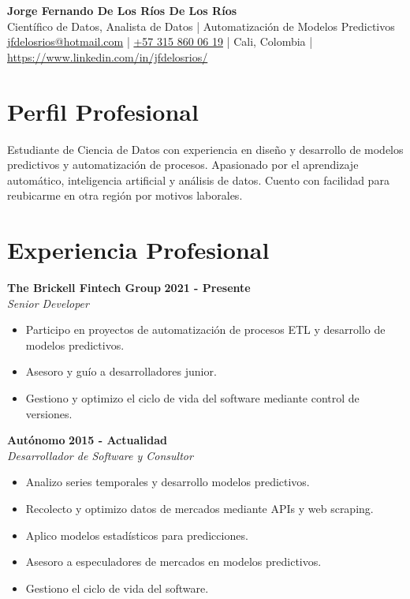 \documentclass[letterpaper,12pt]{article}
\begin{document}
\singlespacing 

\justifying 

\begin{center}
    {\LARGE \textbf{Jorge Fernando De Los R\'ios De Los R\'ios}}\\
    \vspace{0.2cm}
    Cient\'ifico de Datos, Analista de Datos | Automatizaci\'on de Modelos Predictivos\\
    \vspace{0.2cm}
    \href{mailto:jfdelosrios@hotmail.com}{jfdelosrios@hotmail.com} | 
    \href{tel:+573158600619}{+57 315 860 06 19} | 
    Cali, Colombia | 
    \href{https://www.linkedin.com/in/jfdelosrios/}{https://www.linkedin.com/in/jfdelosrios/}
\end{center}

\section*{Perfil Profesional}
Estudiante de Ciencia de Datos con experiencia en dise\~no y desarrollo de modelos predictivos y automatizaci\'on de procesos. Apasionado por el aprendizaje autom\'atico, inteligencia artificial y an\'alisis de datos. Cuento con facilidad para reubicarme en otra región por motivos laborales.

\section*{Experiencia Profesional}

\textbf{The Brickell Fintech Group} \hfill \textbf{2021 - Presente}\\
\textit{Senior Developer}
\begin{itemize}[leftmargin=0.5cm]
    \item Participo en proyectos de automatizaci\'on de procesos ETL y desarrollo de modelos predictivos.
    \item Asesoro y gu\'io a desarrolladores junior.
    \item Gestiono y optimizo el ciclo de vida del software mediante control de versiones.
\end{itemize}

\textbf{Aut\'onomo} \hfill \textbf{2015 - Actualidad}\\
\textit{Desarrollador de Software y Consultor}
\begin{itemize}[leftmargin=0.5cm]
    \item Analizo series temporales y desarrollo modelos predictivos.
    \item Recolecto y optimizo datos de mercados mediante APIs y web scraping.
    \item Aplico modelos estad\'isticos para predicciones.
    \item Asesoro a especuladores de mercados en modelos predictivos.
    \item Gestiono el ciclo de vida del software.
\end{itemize}
\end{document}
